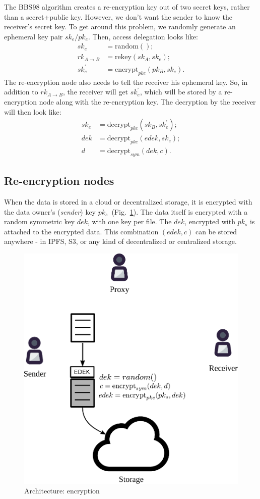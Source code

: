 \documentclass[notitlepage,longbibliography]{revtex4-1}
\begin{document}
The BBS98 algorithm creates a re-encryption key out of two secret keys, rather than a secret+public key.
However, we don't want the sender to know the receiver's secret key.
To get around this problem, we randomly generate an ephemeral key pair $sk_e/pk_e$.
Then, access delegation looks like:
\begin{align}
    sk_e &= \text{random}();\\
    rk_{A\rightarrow B} &= \text{rekey}(sk_A, sk_e);\\
    sk_e^{\prime} &= \text{encrypt}_{pke}(pk_B, sk_e).
\end{align}
The re-encryption node also needs to tell the receiver his ephemeral key.
So, in addition to $rk_{A\rightarrow B}$, the receiver will get $sk_e^{\prime}$, which will be stored by a re-encryption node along with the re-encryption key.
The decryption by the receiver will then look like:
\begin{align}
    sk_e &= \text{decrypt}_{pke}(sk_B, sk_e^{\prime});\\
    dek &= \text{decrypt}_{pke}(edek, sk_e);\\
    d &= \text{decrypt}_{sym}(dek, c).
\end{align}

\subsection{Re-encryption nodes}

When the data is stored in a cloud or decentralized storage, it is encrypted with the data owner's (\emph{sender}) key $pk_s$~(Fig.~\ref{fig:arch-encrypt}).
The data itself is encrypted with a random symmetric key $dek$, with one key per file.
The $dek$, encrypted with $pk_s$ is attached to the encrypted data.
This combination $(edek, c)$ can be stored anywhere - in IPFS, S3, or any kind of decentralized or centralized storage.
\begin{figure}
\centering
    \includegraphics[width=0.4\columnwidth]{pdf/encrypt.pdf}
    \caption{Architecture: encryption}
    \label{fig:arch-encrypt}
\end{figure}
\end{document}
